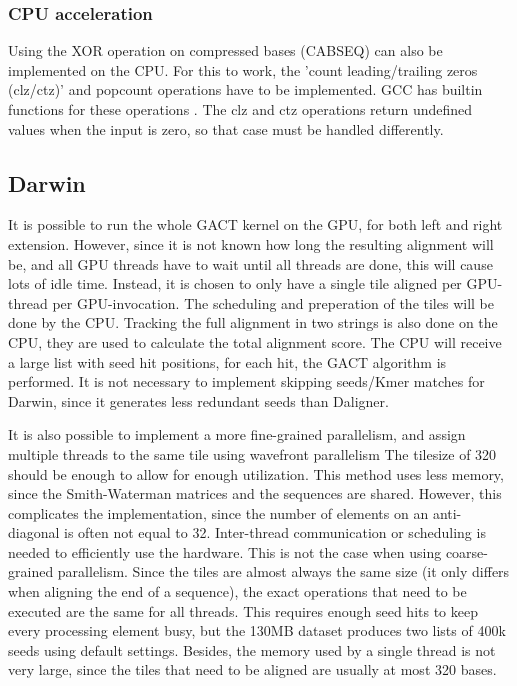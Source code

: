 \documentclass[../main/thesis.tex]{subfiles}
\begin{document}
\subsubsection{CPU acceleration}
Using the XOR operation on compressed bases (CABSEQ) can also be implemented on the CPU.
For this to work, the 'count leading/trailing zeros (clz/ctz)' and popcount operations have to be implemented.
GCC has builtin functions for these operations \cite{GCC}.
The clz and ctz operations return undefined values when the input is zero, so that case must be handled differently.


\subsection{Darwin}
It is possible to run the whole GACT kernel on the GPU, for both left and right extension.
However, since it is not known how long the resulting alignment will be, and all GPU threads have to wait until all threads are done, this will cause lots of idle time.
Instead, it is chosen to only have a single tile aligned per GPU-thread per GPU-invocation.
The scheduling and preperation of the tiles will be done by the CPU.
Tracking the full alignment in two strings is also done on the CPU, they are used to calculate the total alignment score.
The CPU will receive a large list with seed hit positions, for each hit, the GACT algorithm is performed.
It is not necessary to implement skipping seeds/Kmer matches for Darwin, since it generates less redundant seeds than Daligner.



It is also possible to implement a more fine-grained parallelism, and assign multiple threads to the same tile using wavefront parallelism 
The tilesize of 320 should be enough to allow for enough utilization.
This method uses less memory, since the Smith-Waterman matrices and the sequences are shared.
However, this complicates the implementation, since the number of elements on an anti-diagonal is often not equal to 32.
Inter-thread communication or scheduling is needed to efficiently use the hardware.
This is not the case when using coarse-grained parallelism.
Since the tiles are almost always the same size (it only differs when aligning the end of a sequence), the exact operations that need to be executed are the same for all threads.
This requires enough seed hits to keep every processing element busy, but the 130MB dataset produces two lists of 400k seeds using default settings. 
Besides, the memory used by a single thread is not very large, since the tiles that need to be aligned are usually at most 320 bases.
\end{document}
